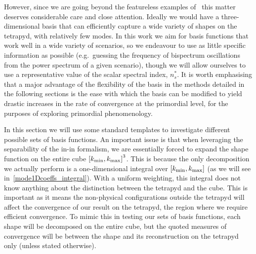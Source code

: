 However, since we are going beyond the featureless examples of~\cite{Funakoshi}
this matter deserves considerable care and close attention.
Ideally we would have a three-dimensional basis that can efficiently
capture a wide variety of shapes on the tetrapyd, with relatively few modes.
In this work we aim for basis functions that work well in a wide variety of scenarios,
so we endeavour to use as little specific information as possible
(e.g.\ guessing the frequency of bispectrum oscillations from
the power spectrum of a given scenario), though we
will allow ourselves to use a representative value
of the scalar spectral index, $n_s^{*}$.   It is worth emphasising that a major advantage of the flexibility of the basis
in the methods detailed in the following sections is the ease with which
the basis can be modified to yield drastic increases in 
the rate of convergence at the primordial level, for the purposes of
exploring primordial phenomenology.


In this section we will use some standard templates to investigate different possible sets of basis functions.
An important issue is that when leveraging the separability of the in-in formalism,
we are essentially forced to expand the shape function on the entire cube ${[{k_\text{min}},{k_\text{max}}]}^3$.
This is because the only decomposition we actually perform is
a one-dimensional integral over $[{k_\text{min}},{k_\text{max}}]$
(as we will see in~\eqref{mode1Dcoeffs_integral}).
With a uniform weighting, this integral does not know anything about the 
distinction between the tetrapyd and the cube.
This is important as it means the non-physical configurations outside the tetrapyd will affect the convergence of our result on the tetrapyd, the region where we require efficient convergence.
To mimic this in testing our sets of basis functions, each shape will be decomposed on the
entire cube, but the quoted measures of convergence will be between the shape
and its reconstruction on the tetrapyd only (unless stated otherwise).


